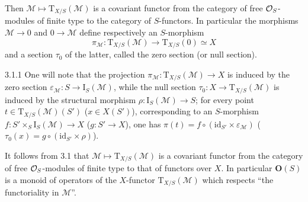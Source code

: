 Then \(\mathcal{M}\mapsto\mathrm{T}_{X/S}(\mathcal{M})\) is a covariant functor
from the category of free \(\mathcal{O}_S\)-modules of finite type to the category of
\(S\)-functors. In particular the morphisms%
{\renewcommand{\thefootnote}{(14)}}
\(\mathcal{M}\to 0\) and \(0\to\mathcal{M}\) define respectively an
\(S\)-morphism
\[
\pi_{\mathcal{M}}\colon
\mathrm{T}_{X/S}(\mathcal{M})\to\mathrm{T}_{X/S}(0)\simeq X
\]
and a section \(\tau_0\) of the latter, called the zero section (or null
section).

\begin{remark}{3.1.1}
\label{II.3.1.1}
{\renewcommand{\thefootnote}{(15)}}
One will note that the projection
\(\pi_{\mathcal{M}}\colon\mathrm{T}_{X/S}(\mathcal{M})\to X\) is induced by
the zero section \(\varepsilon_{\mathcal{M}}\colon S\to\mathrm{I}_S(\mathcal{M})\),
while the null section
\(\tau_0\colon X\to\mathrm{T}_{X/S}(\mathcal{M})\) is induced by the structural
morphism \(\rho\colon\mathrm{I}_S(\mathcal{M})\to S\); \ie for every point
\(t\in\mathrm{T}_{X/S}(\mathcal{M})(S')\)
(\resp \(x\in X(S')\)), corresponding to an \(S\)-morphism
\(f\colon S'\times_S\mathrm{I}_S(\mathcal{M})\to X\)
(\resp \(g\colon S'\to X\)), one has
\(\pi(t)=f\circ(\mathrm{id}_{S'}\times\varepsilon_{\mathcal{M}})\)
(\resp \(\tau_0(x)=g\circ(\mathrm{id}_{S'}\times\rho)\)).
\end{remark}

It follows from 3.1 that \(\mathcal{M}\mapsto\mathrm{T}_{X/S}(\mathcal{M})\)
is a covariant functor from the category of free \(\mathcal{O}_S\)-modules of finite
type to that of functors over \(X\). In particular \(\mathbf{O}(S)\) is a
monoid of operators of the \(X\)-functor \(\mathrm{T}_{X/S}(\mathcal{M})\)
which respects ``the functoriality in \(\mathcal{M}\)''.

